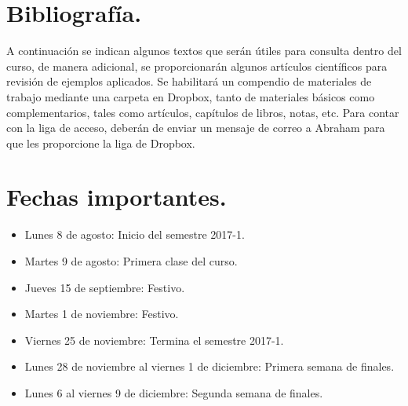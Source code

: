 \documentclass[12pt]{article}
\begin{document}
\section{Bibliografía.}
A continuación se indican algunos textos que serán útiles para consulta dentro del curso, de manera adicional, se proporcionarán algunos artículos científicos para revisión de ejemplos aplicados. Se habilitará un compendio de materiales de trabajo mediante una carpeta en Dropbox, tanto de materiales básicos como complementarios, tales como artículos, capítulos de libros, notas, etc. Para contar con la liga de acceso, deberán de enviar un mensaje de correo a Abraham para que les proporcione la liga de Dropbox.
\nocite{*}
\renewcommand{\refname}{Bibliografía básica.}

\section{Fechas importantes.}
\begin{itemize}
\item Lunes 8 de agosto: Inicio del semestre 2017-1.
\item Martes 9 de agosto: Primera clase del curso.
\item Jueves 15 de septiembre: Festivo.
\item Martes 1 de noviembre: Festivo.
\item Viernes 25 de noviembre: Termina el semestre 2017-1.
\item Lunes 28 de noviembre al viernes 1 de diciembre: Primera semana de finales.
\item Lunes 6 al viernes 9 de diciembre: Segunda semana de finales.
\end{itemize}
\end{document}
